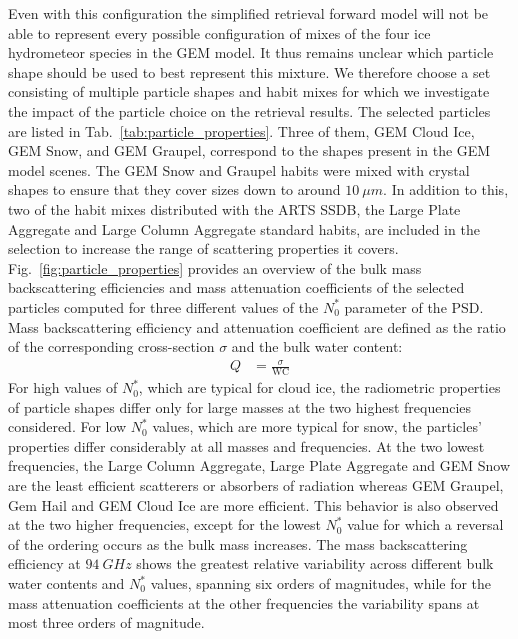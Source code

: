 \documentclass[journal abbreviation, manuscript]{copernicus}
\begin{document}
Even with this configuration the simplified retrieval forward model will not be
able to represent every possible configuration of mixes of the four ice
hydrometeor species in the GEM model. It thus remains unclear which particle
shape should be used to best represent this mixture. We therefore choose a set
consisting of multiple particle shapes and habit mixes for which we investigate
the impact of the particle choice on the retrieval results. The selected
particles are listed in Tab.~\ref{tab:particle_properties}. Three of them, GEM
Cloud Ice, GEM Snow, and GEM Graupel, correspond to the shapes present in the
GEM model scenes. The GEM Snow and Graupel habits were mixed with crystal shapes
to ensure that they cover sizes down to around $10\ \unit{\mu m}$. In addition
to this, two of the habit mixes distributed with the ARTS SSDB, the Large Plate
Aggregate and Large Column Aggregate standard habits, are included in the
selection to increase the range of scattering properties it covers.
Fig.~\ref{fig:particle_properties} provides an overview of the bulk mass
backscattering efficiencies and mass attenuation coefficients of the selected
particles computed for three different values of the $N_0^*$ parameter of the
PSD. Mass backscattering efficiency and attenuation coefficient are defined as
the ratio of the corresponding cross-section $\sigma$ and the bulk water
content:
\begin{align}
  Q &= \frac{\sigma}{\text{WC}}
\end{align}
For high values of $N_0^*$, which are typical for cloud ice, the radiometric
properties of particle shapes differ only for large masses at the two highest
frequencies considered. For low $N_0^*$ values, which are more typical for snow,
the particles' properties differ considerably at all masses and frequencies. At
the two lowest frequencies, the Large Column Aggregate, Large Plate Aggregate
and GEM Snow are the least efficient scatterers or absorbers of radiation
whereas GEM Graupel, Gem Hail and GEM Cloud Ice are more efficient. This
behavior is also observed at the two higher frequencies, except for the lowest
$N_0^*$ value for which a reversal of the ordering occurs as the bulk mass
increases. The mass backscattering efficiency at $94\ \unit{GHz}$ shows the
greatest relative variability across different bulk water contents and $N_0^*$
values, spanning six orders of magnitudes, while for the mass attenuation
coefficients at the other frequencies the variability spans at most three orders
of magnitude.
\end{document}
